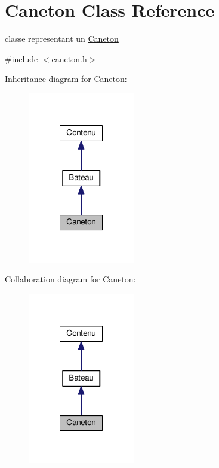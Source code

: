 \hypertarget{classCaneton}{\section{Caneton Class Reference}
\label{classCaneton}
}


classe representant un \hyperlink{classCaneton}{Caneton}  




{\ttfamily \#include $<$caneton.\+h$>$}



Inheritance diagram for Caneton\+:
\nopagebreak
\begin{figure}[H]
\begin{center}
\leavevmode
\includegraphics[width=132pt]{classCaneton__inherit__graph}
\end{center}
\end{figure}


Collaboration diagram for Caneton\+:
\nopagebreak
\begin{figure}[H]
\begin{center}
\leavevmode
\includegraphics[width=132pt]{classCaneton__coll__graph}
\end{center}
\end{figure}
